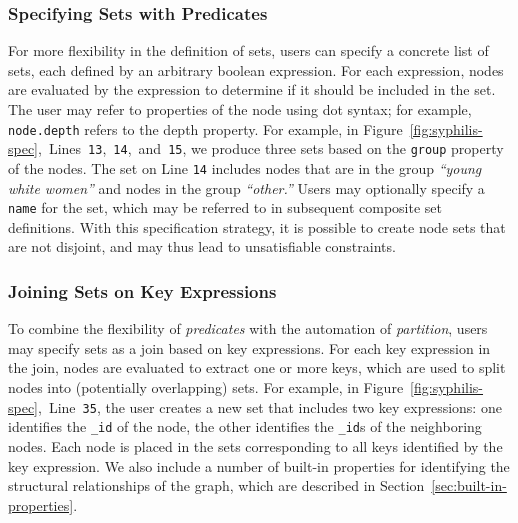 \subsubsection{Specifying Sets with Predicates}
For more flexibility in the definition of sets, users
can specify a concrete list of sets, each defined by an arbitrary boolean
expression. For each expression, nodes are evaluated by the expression
to determine if it should be included in the set. The user may
refer to properties of the node using dot syntax; for example,
\texttt{node.depth} refers to the depth property. For example, in 
Figure~\ref{fig:syphilis-spec},~Lines~\texttt{13},~\texttt{14},~and~\texttt{15},
we produce three sets based on the \texttt{group} property of the nodes.
The set on Line \texttt{14} includes nodes that are in the group 
\emph{``young white women''} and nodes in the group \emph{``other.''}
Users may optionally 
specify a \texttt{name} for the set, which may be referred to in subsequent
composite set definitions. With this specification strategy, it is possible
to create node sets that are not disjoint, and may thus lead to
unsatisfiable constraints.

\subsubsection{Joining Sets on Key Expressions}
To combine the flexibility of \emph{predicates} with the automation of 
\emph{partition}, users may specify sets as a join based on key expressions.
For each key expression in the join, nodes are evaluated to extract one 
or more keys, which are used to split nodes into (potentially overlapping) 
sets. For example, in Figure~\ref{fig:syphilis-spec},~Line~\texttt{35}, the 
user creates a new set that includes two key expressions: one identifies
the \texttt{\_id} of the node, the other identifies the \texttt{\_id}s of
the neighboring nodes. Each node is placed in the sets corresponding to
all keys identified by the key expression. We also include a number of 
built-in properties for identifying the structural relationships of the 
graph, which are described in Section~\ref{sec:built-in-properties}.

